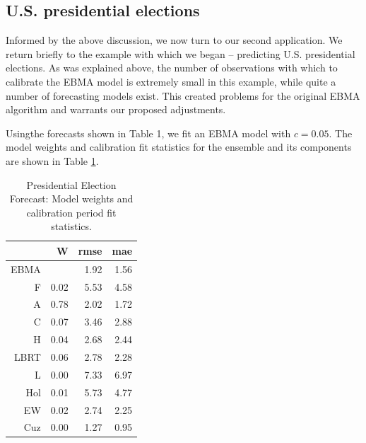\documentclass[12pt,fullpage,endnotes]{article}
\begin{document}
\subsection{U.S. presidential elections}

Informed by the above discussion, we now turn to our second application. We return briefly to the example
with which we began -- predicting U.S. presidential elections.  As was explained above, the number of observations with which to calibrate the EBMA model is extremely small in this example, while quite a number of forecasting models exist. This created problems for the original EBMA algorithm and warrants our proposed adjustments. 

Usingthe forecasts shown in Table 1, we fit an EBMA model with $c=0.05$.
The model weights and calibration fit statistics for the ensemble and
its components are shown in Table \ref{presModel}.


\begin{table}[ht]
\caption{Presidential Election Forecast: Model weights and calibration period fit statistics.}
\label{presModel}
\begin{center}
\begin{tabular}{rrrr}
  \toprule
 & W & rmse & mae \\ 
  \midrule
EBMA &  & 1.92 & 1.56 \\ 
  F & 0.02 & 5.53 & 4.58 \\ 
  A & 0.78 & 2.02 & 1.72 \\ 
  C & 0.07 & 3.46 & 2.88 \\ 
  H & 0.04 & 2.68 & 2.44 \\ 
  LBRT & 0.06 & 2.78 & 2.28 \\ 
  L & 0.00 & 7.33 & 6.97 \\ 
  Hol & 0.01 & 5.73 & 4.77 \\ 
  EW & 0.02 & 2.74 & 2.25 \\ 
  Cuz & 0.00 & 1.27 & 0.95 \\ 
   \bottomrule
\end{tabular}
\end{center}
\end{table}
\end{document}
